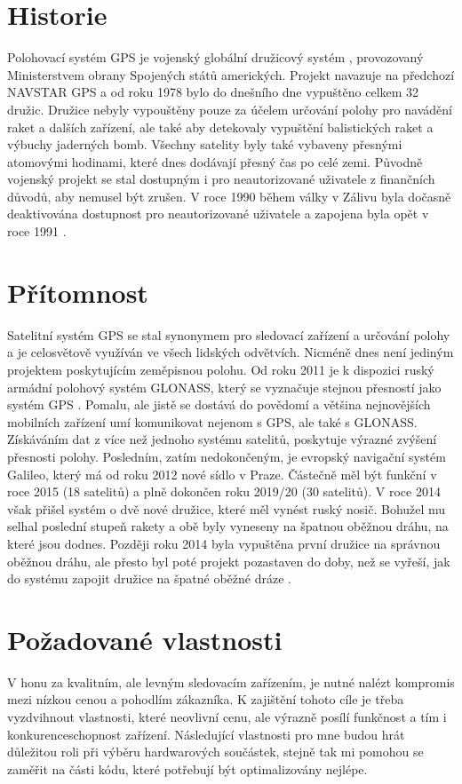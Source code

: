 \documentclass[FM,MP]{tulthesis}  %
\begin{document}
\section{Historie}
Polohovací systém GPS je vojenský globální družicový systém \cite{what}, provozovaný Ministerstvem obrany Spojených států amerických. Projekt navazuje na předchozí NAVSTAR GPS a od roku 1978 bylo do dnešního dne vypuštěno celkem 32 družic. Družice nebyly vypouštěny pouze za účelem určování polohy pro navádění raket a dalších zařízení, ale také aby detekovaly vypuštění balistických raket a výbuchy jaderných bomb. Všechny satelity byly také vybaveny přesnými atomovými hodinami, které dnes dodávají přesný čas po celé zemi. Původně vojenský projekt se stal dostupným i pro neautorizované uživatele z finančních důvodů, aby nemusel být zrušen. V roce 1990 během války v Zálivu byla dočasně deaktivována dostupnost pro neautorizované uživatele a zapojena byla opět v roce 1991  \cite{guide}.

\section{Přítomnost}
Satelitní systém GPS se stal synonymem pro sledovací zařízení a určování polohy a je celosvětově využíván ve všech lidských odvětvích. Nicméně dnes není jediným projektem poskytujícím zeměpisnou polohu. Od roku 2011 je k dispozici ruský armádní polohový systém GLONASS, který se vyznačuje stejnou přesností jako systém GPS \cite{glonass}. Pomalu, ale jistě se dostává do povědomí a většina nejnovějších mobilních zařízení umí komunikovat nejenom s GPS, ale také s GLONASS. Získáváním dat z více než jednoho systému satelitů, poskytuje výrazné zvýšení přesnosti polohy. Posledním, zatím nedokončeným, je evropský navigační systém Galileo, který má od roku 2012 nové sídlo v Praze. Částečně měl být funkční v roce 2015 (18 satelitů) a plně dokončen roku 2019/20 (30 satelitů). V roce 2014 však přišel systém o dvě nové družice, které měl vynést ruský nosič. Bohužel mu selhal poslední stupeň rakety a obě byly vyneseny na špatnou oběžnou dráhu, na které jsou dodnes. Později roku 2014 byla vypuštěna první družice na správnou oběžnou dráhu, ale přesto byl poté projekt pozastaven do doby, než se vyřeší, jak do systému zapojit družice na špatné oběžné dráze \cite{gps}.


\section{Požadované vlastnosti}
V honu za kvalitním, ale levným sledovacím zařízením, je nutné nalézt kompromis mezi nízkou cenou a pohodlím zákazníka. K zajištění tohoto cíle je třeba vyzdvihnout vlastnosti, které neovlivní cenu, ale výrazně posílí funkčnost a tím i konkurenceschopnost zařízení. Následující vlastnosti pro mne budou hrát důležitou roli při výběru hardwarových součástek, stejně tak mi pomohou se zaměřit na části kódu, které potřebují být optimalizovány nejlépe.
\end{document}
